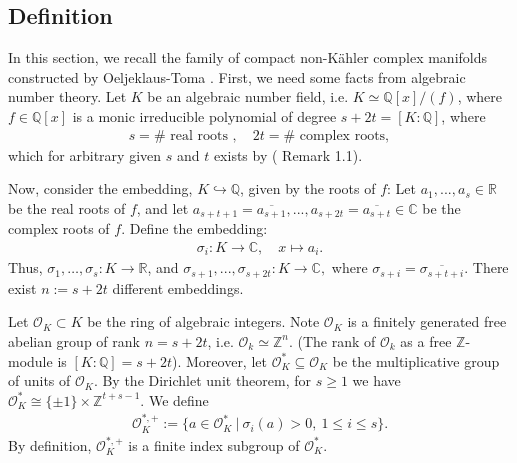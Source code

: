 \documentclass[12pt]{amsart}
\numberwithin{equation}{section}
\newtheorem{thm}[prop]{Theorem}
\numberwithin{prop}{section}
\theoremstyle{definition}
\renewcommand{\bar}[1]{\overline{#1}}
\begin{document}
%
%
\subsection{Definition}
%
%
    
In this section, we recall the family of compact non-Kähler complex manifolds constructed by Oeljeklaus-Toma \cite{oeljeklaus2005non}.  First, we need some facts from algebraic number theory. Let $K$ be an algebraic number field, i.e. $K\simeq \mathbb{Q}[x]/(f)$, where $f\in \mathbb{Q}[x]$ is a monic irreducible polynomial of degree $s+2t=[K:\mathbb{Q}]$, where
    \begin{align*}
        s=\#\text{ real roots },\quad 2t=\#\text{ complex roots},
    \end{align*}
    which for arbitrary given $s$ and $t$ exists by (\cite{oeljeklaus2005non} Remark 1.1).

    Now, consider the embedding, $K \hookrightarrow \mathbb{Q}$, given by the roots of $f$: Let $a_1,...,a_s\in \mathbb{R}$ be the real roots of $f$, and let $a_{s+t+1}=\bar{a_{s+1}}, ..., a_{s+2t}=\bar{a_{s+t}}\in\mathbb{C}$  be the complex roots of $f$. Define the embedding:
    \begin{align*}
        \sigma_i: K\to \mathbb{C}, \quad x\mapsto a_i.
    \end{align*}
    Thus, $\sigma_1,\dots,\sigma_s : K\to \mathbb{R}$, and $\sigma_{s+1},...,\sigma_{s+2t} : K \to \mathbb C,$ where $\sigma_{s + i} = \bar{\sigma_{s + t + i}}$. There exist $n:=s+2t$ different embeddings.

    Let $\mathcal{O}_K\subset K$ be the ring of algebraic integers. Note $\mathcal{O}_K$ is a finitely generated free abelian group of rank $n=s+2t$, i.e. $\mathcal{O}_k\simeq \mathbb{Z}^{n}$. (The rank of $\mathcal{O}_k$ as a free $\mathbb{Z}$-module is $[K:\mathbb{Q}]=s+2t$). Moreover, let $\mathcal{O}_K^*\subseteq \mathcal{O}_K$ be the multiplicative group of units of $\mathcal{O}_K$.  By the Dirichlet unit theorem, for $s \geq 1$ we have $\mathcal O_K^* \cong \{\pm 1\} \times \mathbb Z^{t + s - 1}$.  We define
    \begin{align*}
        \mathcal{O}_K^{*,+}:=\{a \in \mathcal{O}_K^*\ |\ \sigma_i(a)>0,\ 1\leq i\leq s\}.
    \end{align*}
    By definition, $\mathcal{O}_K^{*,+}$ is a finite index subgroup of $\mathcal{O}_K^*$.
\end{document}
